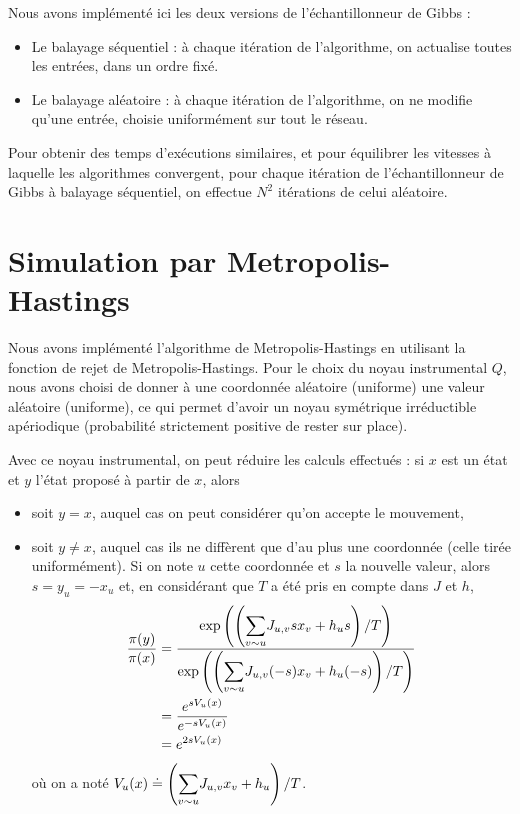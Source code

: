 \documentclass[a4paper,11pt]{article}
\begin{document}
Nous avons implémenté ici les deux versions de l'échantillonneur de Gibbs :
\begin{itemize}
	\item Le balayage séquentiel : à chaque itération de l'algorithme, on actualise toutes les entrées, dans un ordre fixé.
	\item Le balayage aléatoire : à chaque itération de l'algorithme, on ne modifie qu'une entrée, choisie uniformément sur tout le réseau.
\end{itemize}
Pour obtenir des temps d'exécutions similaires, et pour équilibrer les vitesses à laquelle les algorithmes convergent, pour chaque itération de l'échantillonneur de Gibbs à balayage séquentiel, on effectue $N^2$ itérations de celui aléatoire.

\section{Simulation par Metropolis-Hastings}\label{sec:MH}

Nous avons implémenté l'algorithme de Metropolis-Hastings en utilisant la fonction de rejet de Metropolis-Hastings. Pour le choix du noyau instrumental $Q$, nous avons choisi de donner à une coordonnée aléatoire (uniforme) une valeur aléatoire (uniforme), ce qui permet d'avoir un noyau symétrique irréductible apériodique (probabilité strictement positive de rester sur place).

Avec ce noyau instrumental, on peut réduire les calculs effectués : si $x$ est un état et $y$ l'état proposé à partir de $x$, alors
\begin{itemize}
	\item soit $y = x$, auquel cas on peut considérer qu'on accepte le mouvement,
	\item soit $y \neq x$, auquel cas ils ne diffèrent que d'au plus une coordonnée (celle tirée uniformément). Si on note $u$ cette coordonnée et $s$ la nouvelle valeur, alors $s = y_u = - x_u$ et, en considérant que $T$ a été pris en compte dans $J$ et $h$,
	\begin{align*}
	\frac{\pi(y)}{\pi(x)}
	&= \frac{\exp \left(\left( \displaystyle{\sum_{v \sim u}^{}} J_{u,v} s x_{v} + h_{u} s \right) /T \right)}{\exp \left(\left( \displaystyle{\sum_{v \sim u}^{}} J_{u,v} (-s) x_{v} + h_{u} (-s) \right) /T \right)}\\
	&= \frac{e^{s V_u(x)}}{e^{-s V_u(x)}}\\
	&= e^{2 s V_u(x)}
	\end{align*}
	où on a noté $V_u(x) \doteq \left( \displaystyle{\sum_{v \sim u}^{}} J_{u,v} x_v + h_u \right) /T$.
\end{itemize}
\end{document}
